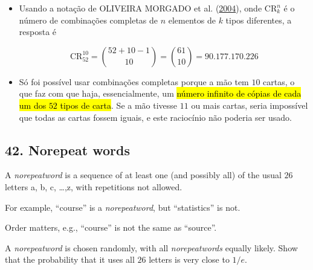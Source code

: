 \documentclass[
  11pt]{report}
\begin{document}
\begin{itemize}
\item
  Usando a notação de OLIVEIRA MORGADO et al. (\protect\hyperlink{ref-oliveira-2004-analis}{2004}), onde $\text{CR}_k^n$ é o número de combinações completas de $n$ elementos de $k$ tipos diferentes, a resposta é

  \[
  \text{CR}_{52}^{10} = \binom{52 + 10 - 1}{10} = \binom{61}{10} =
  90.177.170.226
  \]
\item
  Só foi possível usar combinações completas porque a mão tem $10$ cartas, o que faz com que haja, essencialmente, um {\hl{número infinito de cópias de cada um dos $52$ tipos de carta}}. Se a mão tivesse $11$ ou mais cartas, seria impossível que todas as cartas fossem iguais, e este raciocínio não poderia ser usado.
\end{itemize}

\hypertarget{norepeat-words}{%
\subsection*{42. Norepeat words}\label{norepeat-words}}

\begin{rmdbox}
A \emph{norepeatword} is a sequence of at least one (and possibly all) of the usual $26$ letters a, b, c, \ldots,z, with repetitions not allowed.

For example, ``course'' is a \emph{norepeatword}, but ``statistics'' is not.

Order matters, e.g., ``course'' is not the same as ``source''.

A \emph{norepeatword} is chosen randomly, with all \emph{norepeatwords} equally likely. Show that the probability that it uses all $26$ letters is very close to $1/e$.

\end{rmdbox}
\end{document}
